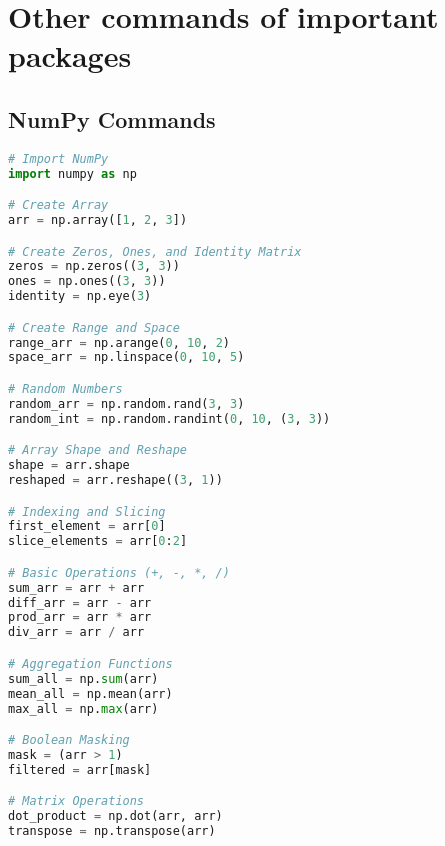 \documentclass[english, threecolumn]{latex4ei/latex4ei_sheet}
\begin{document}
\section{Other commands of important packages}
\begin{sectionbox}
\subsection{NumPy Commands}
\begin{lstlisting}[language=Python, gobble=0]
# Import NumPy
import numpy as np

# Create Array
arr = np.array([1, 2, 3])

# Create Zeros, Ones, and Identity Matrix
zeros = np.zeros((3, 3))
ones = np.ones((3, 3))
identity = np.eye(3)

# Create Range and Space
range_arr = np.arange(0, 10, 2)
space_arr = np.linspace(0, 10, 5)

# Random Numbers
random_arr = np.random.rand(3, 3)
random_int = np.random.randint(0, 10, (3, 3))

# Array Shape and Reshape
shape = arr.shape
reshaped = arr.reshape((3, 1))

# Indexing and Slicing
first_element = arr[0]
slice_elements = arr[0:2]

# Basic Operations (+, -, *, /)
sum_arr = arr + arr
diff_arr = arr - arr
prod_arr = arr * arr
div_arr = arr / arr

# Aggregation Functions
sum_all = np.sum(arr)
mean_all = np.mean(arr)
max_all = np.max(arr)

# Boolean Masking
mask = (arr > 1)
filtered = arr[mask]

# Matrix Operations
dot_product = np.dot(arr, arr)
transpose = np.transpose(arr)

\end{lstlisting}
\end{sectionbox}
\end{document}
